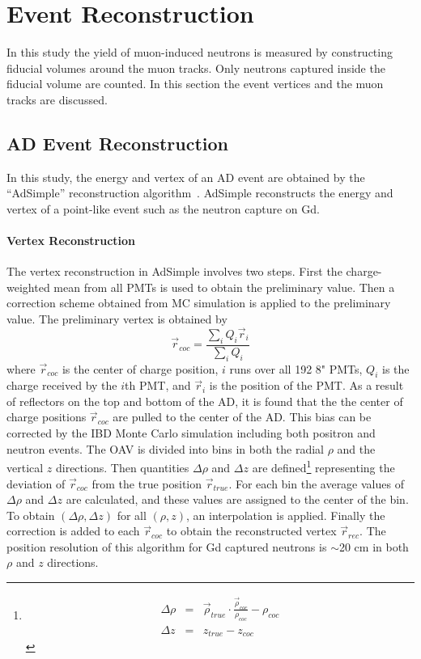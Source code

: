 \section{Event Reconstruction}
In this study the yield of muon-induced neutrons is measured by constructing fiducial volumes around the muon tracks. Only neutrons captured inside the fiducial volume are counted. In this section the event vertices and the muon tracks are discussed.

\subsection{AD Event Reconstruction}
In this study, the energy and vertex of an AD event are obtained by the ``AdSimple'' reconstruction algorithm~\cite{docdb7334}. AdSimple reconstructs the energy and vertex of a point-like event such as the neutron capture on Gd.
\paragraph{Vertex Reconstruction} The vertex reconstruction in AdSimple involves two steps. First the charge-weighted mean from all PMTs is used to obtain the preliminary value. Then a correction scheme obtained from MC simulation is applied to the preliminary value.
The preliminary vertex is obtained by
\begin{equation}
	\vec{r}_{coc}=\frac{\sum\limits_iQ_i\vec{r}_i}{\sum\limits_iQ_i}
\end{equation}
where $\vec{r}_{coc}$ is the center of charge position, $i$ runs over all 192 8" PMTs, $Q_i$ is the charge received by the $i$th PMT, and $\vec{r}_i$ is the position of the PMT.
As a result of reflectors on the top and bottom of the AD, it is found that the the center of charge positions $\vec{r}_{coc}$ are pulled to the center of the AD. This bias can be corrected by the IBD Monte Carlo simulation including both positron and neutron events. The OAV is divided into bins in both the radial $\rho$ and the vertical $z$ directions. Then quantities $\Delta \rho$ and $\Delta z$ are defined\footnote{\begin{eqnarray}
\Delta \rho &=& \vec{\rho}_{true}\cdot \frac{\vec{\rho}_{coc}}{\rho_{coc}}-\rho_{coc} \\
\Delta z &=& z_{true}-z_{coc}
\end{eqnarray}} representing the deviation of $\vec{r}_{coc}$ from the true position $\vec{r}_{true}$. For each bin the average values of $\Delta \rho$ and $\Delta z$ are calculated, and these values are assigned to the center of the bin. To obtain $(\Delta\rho,\Delta z)$ for all $(\rho,z)$, an interpolation is applied. Finally the correction is added to each $\vec{r}_{coc}$ to obtain the reconstructed vertex $\vec{r}_{rec}$. The position resolution of this algorithm for Gd captured neutrons is $\sim$20 cm in both $\rho$ and $z$ directions.

